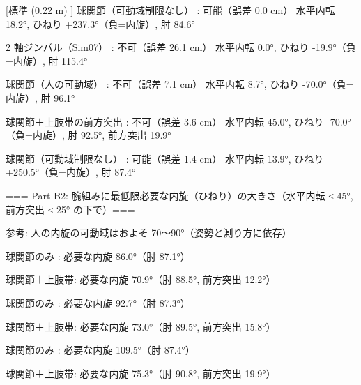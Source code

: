 {  [標準 (0.22 m)     ] 球関節（可動域制限なし）        : 可能（誤差   0.0 cm）  水平内転  18.2°, ひねり +237.3°（負=内旋）, 肘  84.6°\par
  [厚い胸板・装甲 (0.26 m)] 2 軸ジンバル（Sim07）      : 不可（誤差  26.1 cm）  水平内転   0.0°, ひねり  -19.9°（負=内旋）, 肘 115.4°\par
  [厚い胸板・装甲 (0.26 m)] 球関節（人の可動域）          : 不可（誤差   7.1 cm）  水平内転   8.7°, ひねり  -70.0°（負=内旋）, 肘  96.1°\par
  [厚い胸板・装甲 (0.26 m)] 球関節＋上肢帯の前方突出        : 不可（誤差   3.6 cm）  水平内転  45.0°, ひねり  -70.0°（負=内旋）, 肘  92.5°, 前方突出 19.9°\par
  [厚い胸板・装甲 (0.26 m)] 球関節（可動域制限なし）        : 可能（誤差   1.4 cm）  水平内転  13.9°, ひねり +250.5°（負=内旋）, 肘  87.4°\par
\mbox{}\par
=== Part B2: 腕組みに最低限必要な内旋（ひねり）の大きさ（水平内転 ≤ 45°, 前方突出 ≤ 25° の下で）===\par
  参考: 人の内旋の可動域はおよそ 70〜90°（姿勢と測り方に依存）\par
  [細身 (奥行 0.18 m)  ] 球関節のみ    : 必要な内旋  86.0°（肘  87.1°）\par
  [細身 (奥行 0.18 m)  ] 球関節＋上肢帯: 必要な内旋  70.9°（肘  88.5°, 前方突出 12.2°）\par
  [標準 (0.22 m)     ] 球関節のみ    : 必要な内旋  92.7°（肘  87.3°）\par
  [標準 (0.22 m)     ] 球関節＋上肢帯: 必要な内旋  73.0°（肘  89.5°, 前方突出 15.8°）\par
  [厚い胸板・装甲 (0.26 m)] 球関節のみ    : 必要な内旋 109.5°（肘  87.4°）\par
  [厚い胸板・装甲 (0.26 m)] 球関節＋上肢帯: 必要な内旋  75.3°（肘  90.8°, 前方突出 19.9°）\par
}

